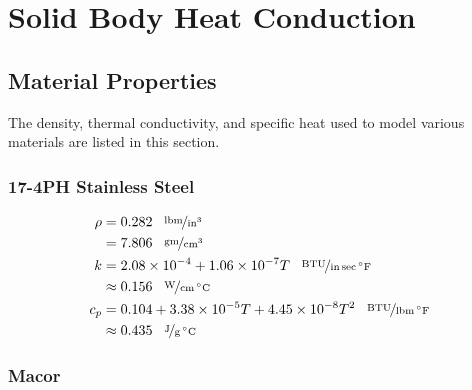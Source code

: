 \chapter{Solid Body Heat Conduction}

\section{Material Properties}
The density, thermal conductivity, and specific heat used to model various materials are listed in this section.

\subsection{17-4PH Stainless Steel}
\begin{align}
  \rho &= 0.282\;\;\;\unitfrac{lbm}{in^3}\\
       &= 7.806\;\;\;\unitfrac{gm}{cm^3}\nonumber \\
  k    &= 2.08\times 10^{-4} + 1.06\times 10^{-7}T\;\;\;\unitfrac{BTU}{in\,sec\,^\circ F} \\
       &\approx 0.156\;\;\;\unitfrac{W}{cm\, ^\circ C}\nonumber \\
  c_p  &= 0.104   + 3.38\times10^{-5}T + 4.45\times 10^{-8} T^2\;\;\;\unitfrac{BTU}{lbm\,^\circ F} \\
       &\approx0.435\;\;\;\unitfrac{J}{g\, ^\circ C}\nonumber
\end{align}


\subsection{Macor}

